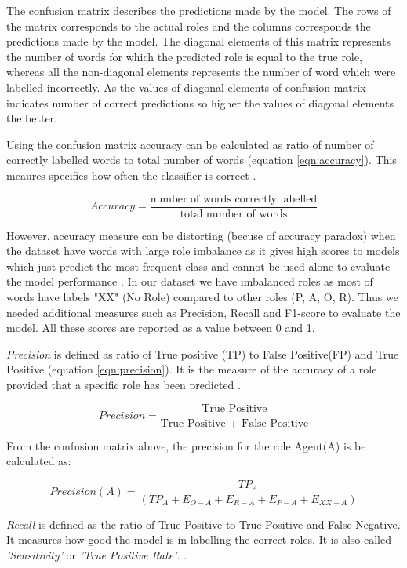 The confusion matrix describes the predictions made by the model. The rows of the matrix corresponds to the actual roles and the columns corresponds the predictions made by the model. The diagonal elements of this matrix represents the number of words for which the predicted role is equal to the true role,  whereas all the non-diagonal elements represents the number of word which were labelled incorrectly. As the values of diagonal elements of confusion matrix indicates number of correct predictions so higher the values of diagonal elements the better.

Using the confusion matrix accuracy can be calculated as ratio of number of correctly labelled words to total number of words (equation \ref{eqn:accuracy}). This meaures specifies how often the classifier is correct \cite{classification_scores:2009}. 

\begin{equation}\label{eqn:accuracy}
Accuracy = \frac{\text{number of words correctly labelled}}{\text{total number of words}}
\end{equation}
 
However, accuracy measure can be distorting (becuse of accuracy paradox) when the dataset have words with large role imbalance as it gives high scores to models which just predict the most frequent class and cannot be used alone to evaluate the model performance \cite{accuracy_paradox_1:2008, accuracy_paradox_2:2014}. In our dataset we have imbalanced roles as most of words have labels "XX" (No Role) compared to other roles (P, A, O, R). Thus we needed additional measures such as Precision, Recall and F1-score to evaluate the model. All these scores are reported as a value between 0 and 1. 

\textit{Precision} is defined as ratio of True positive (TP) to False Positive(FP) and True Positive (equation \ref{eqn:precision}). It is the measure of the accuracy of a role provided that a specific role has been predicted \cite{classification_scores:2009}.

\begin{equation}\label{eqn:precision}
Precision = \frac{\text{True Positive}}{\text{True Positive + False Positive}}
\end{equation}

From the confusion matrix above, the precision for the role Agent(A) is be calculated as:

\[Precision(A) = \frac{TP_{A}}{(TP_{A}+E_{O-A}+E_{R-A}+E_{P-A}+E_{XX-A})}\]

\noindent \textit{Recall} is defined as the ratio of True Positive to True Positive and False Negative. It measures how good the model is in labelling the correct roles. It is also called \textit{'Sensitivity'} or \textit{'True Positive Rate'}. \cite{classification_scores:2009}.

